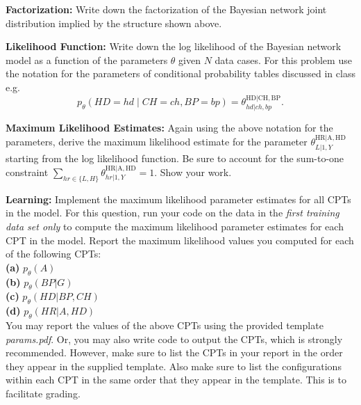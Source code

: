 \documentclass[11pt]{article}
\newcommand{\HR}{\mathrm{HR}}
\newcommand{\A}{\mathrm{A}}
\newcommand{\HD}{\mathrm{HD}}
\newcommand{\CH}{\mathrm{CH}}
\newcommand{\BP}{\mathrm{BP}}
\begin{document}
\begin{problem}{10} \textbf{Factorization:} Write down the factorization of the Bayesian network joint distribution implied by the structure shown above. 
\end{problem}


\begin{problem}{10} \textbf{Likelihood Function:} Write down the log likelihood of the Bayesian network model as a function of the parameters $\theta$ given $N$ data cases. For this problem use the notation for the parameters of conditional probability tables discussed in class e.g.
  \[ p_{\theta}(HD=hd \mid CH=ch,BP=bp)=\theta^{\HD|\CH,\BP}_{hd|ch,bp}. \]
\end{problem}

\begin{problem}{15} \textbf{Maximum Likelihood Estimates:} Again using the above notation for the parameters, derive the maximum likelihood estimate for the parameter $\theta^{\HR|\A,\HD}_{L|1,Y}$ starting from the log likelihood function.  Be sure to account for the sum-to-one constraint $\sum\limits_{hr\in\{L,H\}} \theta^{\HR|\A,\HD}_{hr|1,Y}=1$.  Show your work.
\end{problem}

\begin{problem}{15} \textbf{Learning:} Implement the maximum likelihood parameter estimates for all CPTs in the model. For this question, run your code on the data in the \textit{first training data set only} to compute the maximum likelihood parameter estimates for each CPT in the model. Report the maximum likelihood values you computed for each of the following CPTs:\\
	
\textbf{(a)} $p_{\theta}(A)$\\
\textbf{(b)} $p_{\theta}(BP|G)$\\
\textbf{(c)} $p_{\theta}(HD|BP,CH)$\\
\textbf{(d)} $p_{\theta}(HR|A,HD)$\\

You may report the values of the above CPTs using the provided template \textit{params.pdf}. Or, you may also write code to output the CPTs, which is strongly recommended. However, make sure to list the CPTs in your report in the order they appear in the supplied template. Also make sure to list the configurations within each CPT in the same order that they appear in the template. This is to facilitate grading. 
\end{problem}
\end{document}
